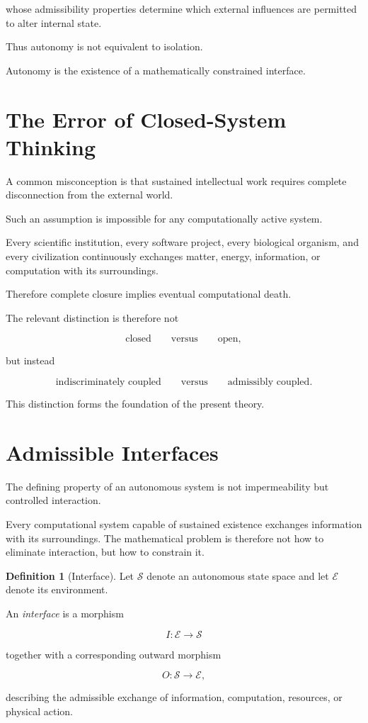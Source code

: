 \documentclass[11pt,oneside]{book}
\numberwithin{equation}{chapter}
\theoremstyle{definition}
\newtheorem{definition}{Definition}[chapter]
\theoremstyle{plain}
\begin{document}
whose admissibility properties determine which external influences are
permitted to alter internal state.

Thus autonomy is not equivalent to isolation.

Autonomy is the existence of a mathematically constrained interface.

\section{The Error of Closed-System Thinking}

A common misconception is that sustained intellectual work requires complete
disconnection from the external world.

Such an assumption is impossible for any computationally active system.

Every scientific institution, every software project, every biological
organism, and every civilization continuously exchanges matter, energy,
information, or computation with its surroundings.

Therefore complete closure implies eventual computational death.

The relevant distinction is therefore not

\[
\text{closed}
\qquad
\text{versus}
\qquad
\text{open},
\]

but instead

\[
\text{indiscriminately coupled}
\qquad
\text{versus}
\qquad
\text{admissibly coupled}.
\]

This distinction forms the foundation of the present theory.

\section{Admissible Interfaces}

The defining property of an autonomous system is not impermeability but
controlled interaction.

Every computational system capable of sustained existence exchanges
information with its surroundings. The mathematical problem is therefore not
how to eliminate interaction, but how to constrain it.

\begin{definition}[Interface]
Let $\mathcal{S}$ denote an autonomous state space and let
$\mathcal{E}$ denote its environment.

An \emph{interface} is a morphism

\[
I:\mathcal{E}\longrightarrow\mathcal{S}
\]

together with a corresponding outward morphism

\[
O:\mathcal{S}\longrightarrow\mathcal{E},
\]

describing the admissible exchange of information, computation,
resources, or physical action.
\end{definition}
\end{document}
